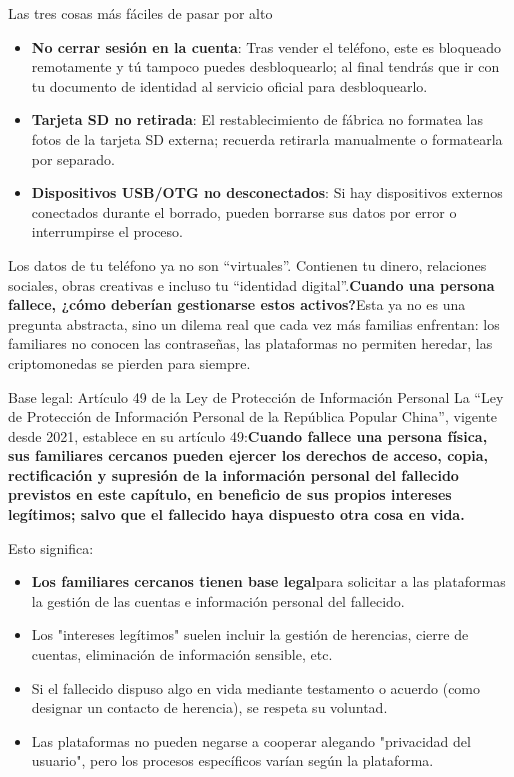 \begin{tcbwarn}{Las tres cosas más fáciles de pasar por alto}
\begin{itemize}
  \item \textbf{No cerrar sesión en la cuenta}: Tras vender el teléfono, este es bloqueado remotamente y tú tampoco puedes desbloquearlo; al final tendrás que ir con tu documento de identidad al servicio oficial para desbloquearlo.
  \item \textbf{Tarjeta SD no retirada}: El restablecimiento de fábrica no formatea las fotos de la tarjeta SD externa; recuerda retirarla manualmente o formatearla por separado.
  \item \textbf{Dispositivos USB/OTG no desconectados}: Si hay dispositivos externos conectados durante el borrado, pueden borrarse sus datos por error o interrumpirse el proceso.
\end{itemize}

\end{tcbwarn}


Los datos de tu teléfono ya no son “virtuales”. Contienen tu dinero, relaciones sociales, obras creativas e incluso tu “identidad digital”.\textbf{Cuando una persona fallece, ¿cómo deberían gestionarse estos activos?}Esta ya no es una pregunta abstracta, sino un dilema real que cada vez más familias enfrentan: los familiares no conocen las contraseñas, las plataformas no permiten heredar, las criptomonedas se pierden para siempre.

\begin{tcbinfo}{Base legal: Artículo 49 de la Ley de Protección de Información Personal}
La “Ley de Protección de Información Personal de la República Popular China”, vigente desde 2021, establece en su artículo 49:\textbf{Cuando fallece una persona física, sus familiares cercanos pueden ejercer los derechos de acceso, copia, rectificación y supresión de la información personal del fallecido previstos en este capítulo, en beneficio de sus propios intereses legítimos; salvo que el fallecido haya dispuesto otra cosa en vida.}

Esto significa:

\begin{itemize}
  \item \textbf{Los familiares cercanos tienen base legal}para solicitar a las plataformas la gestión de las cuentas e información personal del fallecido.
  \item Los "intereses legítimos" suelen incluir la gestión de herencias, cierre de cuentas, eliminación de información sensible, etc.
  \item Si el fallecido dispuso algo en vida mediante testamento o acuerdo (como designar un contacto de herencia), se respeta su voluntad.
  \item Las plataformas no pueden negarse a cooperar alegando "privacidad del usuario", pero los procesos específicos varían según la plataforma.
\end{itemize}

\end{tcbinfo}

